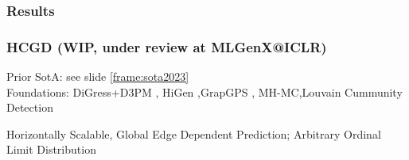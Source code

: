 \documentclass[./presentation.tex]{subfiles}
\begin{document}
\begin{frame}[c,label=hcgd]
  \frametitle{Results}
\end{frame}

\begin{frame}[t,label=hcgd]
  \frametitle{HCGD (WIP, under review at MLGenX@ICLR)}
  \vspace{-1cm}
  \begin{priorart}
    Prior SotA: see slide \ref{frame:sota2023}\\%
    Foundations: DiGress+D3PM \citep{krawczukGGGANGeometricGraph2020,austinStructuredDenoisingDiffusion2021e}, HiGen \citep{karamiHiGenHierarchicalGraph2023a},GrapGPS \citep{rampasekRecipeGeneralPowerful2022b}, MH-MC\citep{metropolisEquationStateCalculations1953a},Louvain Cummunity Detection\citep{newmanFindingEvaluatingCommunity2004,blondelFastUnfoldingCommunities2008d}
  \end{priorart}
  \begin{contributions}
    Horizontally Scalable, Global Edge Dependent Prediction; Arbitrary Ordinal Limit Distribution
  \end{contributions}
\end{frame}
\end{document}
